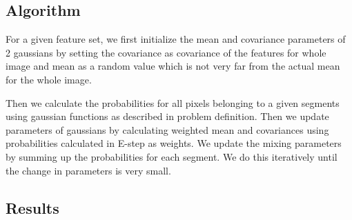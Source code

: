 \documentclass{article}
\begin{document}
\subsection{Algorithm}
For a given feature set, we first initialize the mean and covariance parameters of 2 gaussians by setting the covariance as covariance of the features for whole image and mean as a random value which is not very far from the actual mean for the whole image.

Then we calculate the probabilities for all pixels belonging to a given segments using gaussian functions as described in problem definition. Then we update parameters of gaussians by calculating weighted mean and covariances using probabilities calculated in E-step as weights. We update the mixing parameters by summing up the probabilities for each segment. We do this iteratively until the change in parameters is very small.

\subsection{Results}
\newpage
\end{document}

